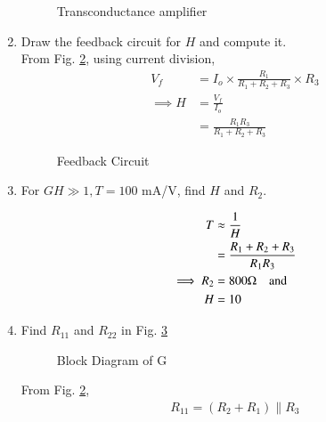 \begin{enumerate}[label=\arabic*.,ref=\theenumi]
\begin{figure}[!ht]
	\begin{center}
		\resizebox{\columnwidth}{!}{}
	\end{center}
\caption{Transconductance amplifier}
\label{fig:ee18btech11041_fig4}
\end{figure}
%
\item  Draw the feedback circuit for $H$ and compute it.
\\
\solution From Fig. \ref{fig:ee18btech11041_fig5}, using current division,
%
\begin{align}
V_f &= I_o \times \frac{R_1}{R_1+R_2+R_3}\times R_3
\\
\implies 
H &= \frac{V_f}{I_o}
\\
&= \frac{R_1 R_3}{R_1+R_2+R_3}
\end{align}
\begin{figure}[!ht]
	\begin{center}
		\resizebox{\columnwidth}{!}{}
	\end{center}
\caption{Feedback Circuit}
\label{fig:ee18btech11041_fig5}
\end{figure}

\item For $GH \gg 1,T = 100$ mA/V, find $H$ and $R_2$.
\\
\solution 

\begin{align}
    T &\approx \frac{1}{H}
    \label{eq:ee18btech11041_eq6}
\\
     &= \frac{R_1+R_2+R_3}{R_1 R_3}
\\
\implies     R_2 &= 800 \ohm \quad \text{and}
    \label{eq:ee18btech11041_eq7}
\\
 H &=10
\end{align}

\item Find $R_{11}$ and $R_{22}$ in Fig. \ref{fig:ee18btech11041_fig6}


\begin{figure}[!ht]
	\begin{center}
		\resizebox{\columnwidth}{!}{}
	\end{center}
\caption{Block Diagram of G}
\label{fig:ee18btech11041_fig6}
\end{figure}
\solution  From Fig. \ref{fig:ee18btech11041_fig5},
%
\begin{align}
    R_{11} = (R_2+R_1)\parallel R_3
\end{align}


\end{enumerate}

